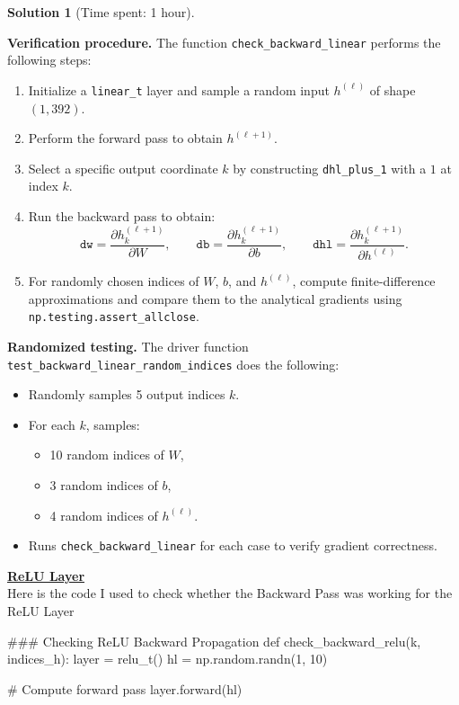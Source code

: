 \documentclass[11pt, reqno, letterpaper, twoside]{amsart}
\theoremstyle{plain}
\theoremstyle{definition}
\newtheorem{solution}[theorem]{Solution}
\begin{document}
\begin{solution}[Time spent: 1 hour]
\begin{enumerate}
\textbf{Verification procedure.}
The function \verb|check_backward_linear| performs the following steps:
\begin{enumerate}
  \item Initialize a \verb|linear_t| layer and sample a random input $h^{(\ell)}$ of shape $(1, 392)$.
  \item Perform the forward pass to obtain $h^{(\ell+1)}$.
  \item Select a specific output coordinate $k$ by constructing \verb|dhl_plus_1| with a $1$ at index $k$.
  \item Run the backward pass to obtain:
  \[
  \texttt{dw} = \frac{\partial h^{(\ell+1)}_{k}}{\partial W}, \qquad
  \texttt{db} = \frac{\partial h^{(\ell+1)}_{k}}{\partial b}, \qquad
  \texttt{dhl} = \frac{\partial h^{(\ell+1)}_{k}}{\partial h^{(\ell)}}.
  \]
  \item For randomly chosen indices of $W$, $b$, and $h^{(\ell)}$, compute finite-difference approximations and compare them to the analytical gradients using \verb|np.testing.assert_allclose|. \\
\end{enumerate}

\textbf{Randomized testing.}
The driver function \verb|test_backward_linear_random_indices| does the following:
\begin{itemize}
  \item Randomly samples 5 output indices $k$.
  \item For each $k$, samples:
    \begin{itemize}
      \item 10 random indices of $W$,
      \item 3 random indices of $b$,
      \item 4 random indices of $h^{(\ell)}$.
    \end{itemize}
  \item Runs \verb|check_backward_linear| for each case to verify gradient correctness. \\
\end{itemize}


\textbf{\underline{ReLU Layer}} \\
Here is the code I used to check whether the Backward Pass was working for the ReLU Layer
\begin{python}
    ### Checking ReLU Backward Propagation
def check_backward_relu(k, indices_h):
    layer = relu_t()
    hl = np.random.randn(1, 10)

    # Compute forward pass
    layer.forward(hl)


\end{python}
\end{enumerate}
\end{solution}
\end{document}
